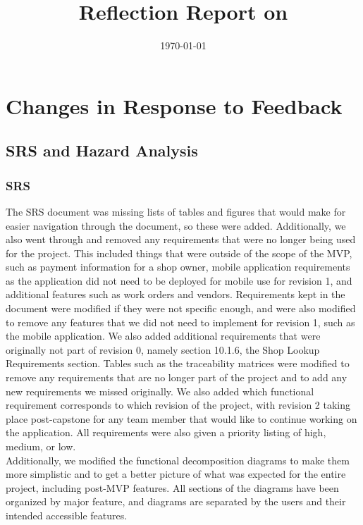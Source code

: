 \documentclass{article}
\title{Reflection Report on \progname}
\author{\authname}
\date{\today}
\begin{document}
\maketitle

\section{Changes in Response to Feedback}

\subsection{SRS and Hazard Analysis}

\subsubsection{SRS}
The SRS document was missing lists of tables and figures that would make for easier navigation through the document, so these were added. Additionally, we also went through and removed any requirements that were no longer being used for the project. This included things that were outside of the scope of the MVP, such as payment information for a shop owner, mobile application requirements as the application did not need to be deployed for mobile use for revision 1, and additional features such as work orders and vendors. Requirements kept in the document were modified if they were not specific enough, and were also modified to remove any features that we did not need to implement for revision 1, such as the mobile application. We also added additional requirements that were originally not part of revision 0, namely section 10.1.6, the Shop Lookup Requirements section. Tables such as the traceability matrices were modified to remove any requirements that are no longer part of the project and to add any new requirements we missed originally. We also added which functional requirement corresponds to which revision of the project, with revision 2 taking place post-capstone for any team member that would like to continue working on the application. All requirements were also given a priority listing of high, medium, or low. \\
\noindent Additionally, we modified the functional decomposition diagrams to make them more simplistic and to get a better picture of what was expected for the entire project, including post-MVP features. All sections of the diagrams have been organized by major feature, and diagrams are separated by the users and their intended accessible features.
\end{document}
